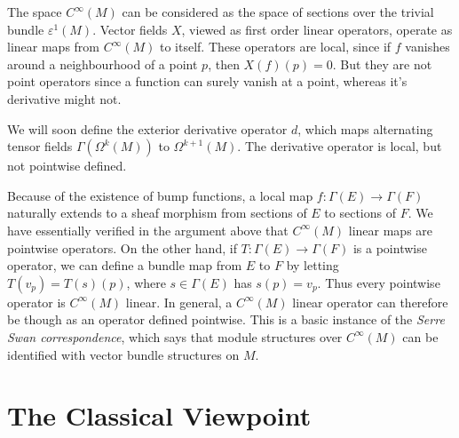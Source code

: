 \begin{example}
    The space $C^\infty(M)$ can be considered as the space of sections over the trivial bundle $\varepsilon^1(M)$. Vector fields $X$, viewed as first order linear operators, operate as linear maps from $C^\infty(M)$ to itself. These operators are local, since if $f$ vanishes around a neighbourhood of a point $p$, then $X(f)(p) = 0$. But they are not point operators since a function can surely vanish at a point, whereas it's derivative might not.
\end{example}

\begin{example}
    We will soon define the exterior derivative operator $d$, which maps alternating tensor fields $\Gamma(\Omega^k(M))$ to $\Omega^{k+1}(M)$. The derivative operator is local, but not pointwise defined.
\end{example}

Because of the existence of bump functions, a local map $f: \Gamma(E) \to \Gamma(F)$ naturally extends to a sheaf morphism from sections of $E$ to sections of $F$. We have essentially verified in the argument above that $C^\infty(M)$ linear maps are pointwise operators. On the other hand,  if $T: \Gamma(E) \to \Gamma(F)$ is a pointwise operator, we can define a bundle map from $E$ to $F$ by letting $T(v_p) = T(s)(p)$, where $s \in \Gamma(E)$ has $s(p) = v_p$. Thus every pointwise operator is $C^\infty(M)$ linear. In general, a $C^\infty(M)$ linear operator can therefore be though as an operator defined pointwise. This is a basic instance of the {\it Serre Swan correspondence}, which says that module structures over $C^\infty(M)$ can be identified with vector bundle structures on $M$.

\section{The Classical Viewpoint}

